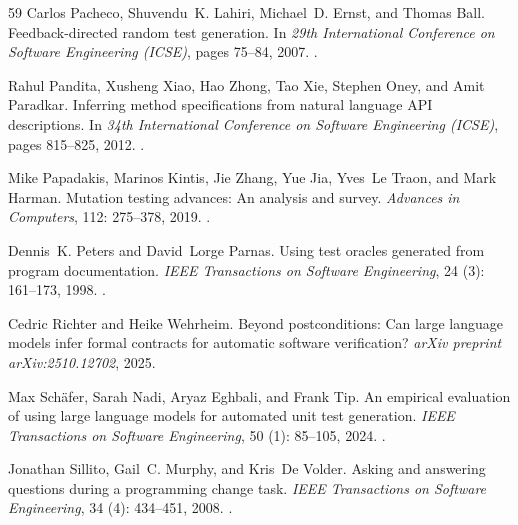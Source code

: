\documentclass[11pt]{article}
\begin{document}
\begin{thebibliography}{59}
Carlos Pacheco, Shuvendu~K. Lahiri, Michael~D. Ernst, and Thomas Ball.
\newblock Feedback-directed random test generation.
\newblock In \emph{29th International Conference on Software Engineering
  (ICSE)}, pages 75--84, 2007.
\newblock {}.

Rahul Pandita, Xusheng Xiao, Hao Zhong, Tao Xie, Stephen Oney, and Amit
  Paradkar.
\newblock Inferring method specifications from natural language {API}
  descriptions.
\newblock In \emph{34th International Conference on Software Engineering
  (ICSE)}, pages 815--825, 2012.
\newblock {}.

Mike Papadakis, Marinos Kintis, Jie Zhang, Yue Jia, Yves~Le Traon, and Mark
  Harman.
\newblock Mutation testing advances: An analysis and survey.
\newblock \emph{Advances in Computers}, 112: 275--378, 2019.
\newblock {}.

Dennis~K. Peters and David~Lorge Parnas.
\newblock Using test oracles generated from program documentation.
\newblock \emph{IEEE Transactions on Software Engineering}, 24
  (3): 161--173, 1998.
\newblock {}.

Cedric Richter and Heike Wehrheim.
\newblock Beyond postconditions: Can large language models infer formal
  contracts for automatic software verification?
\newblock \emph{arXiv preprint arXiv:2510.12702}, 2025.

Max Sch{\"a}fer, Sarah Nadi, Aryaz Eghbali, and Frank Tip.
\newblock An empirical evaluation of using large language models for automated
  unit test generation.
\newblock \emph{IEEE Transactions on Software Engineering}, 50
  (1): 85--105, 2024.
\newblock {}.

Jonathan Sillito, Gail~C. Murphy, and Kris~De Volder.
\newblock Asking and answering questions during a programming change task.
\newblock \emph{IEEE Transactions on Software Engineering}, 34
  (4): 434--451, 2008.
\newblock {}.


\end{thebibliography}
\end{document}
